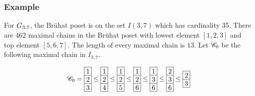 
\subsubsection{Example}

For \(G_{{3},{7}}\), the Br\"{u}hat poset is on the set \(I(3,7)\) which has cardinality 35. There are 462 maximal chains in the Br\"{u}hat poset with lowest element \([1,2,3]\) and top element \([5,6,7]\). The length of every maximal chain is \(13\). Let \(\mathscr{C}_0\) be the following maximal chain in \(I_{3,7}\). 

\[
\SC_0 = 
\begin{array}[c]{*{1}c}\cline{1-1}
\lr{1}\\\cline{1-1}
\lr{2}\\\cline{1-1}
\lr{3}\\\cline{1-1}
\end{array}
\le
\begin{array}[c]{*{1}c}\cline{1-1}
\lr{1}\\\cline{1-1}
\lr{2}\\\cline{1-1}
\lr{4}\\\cline{1-1}
\end{array}
\le
\begin{array}[c]{*{1}c}\cline{1-1}
\lr{1}\\\cline{1-1}
\lr{2}\\\cline{1-1}
\lr{5}\\\cline{1-1}
\end{array}
\le
\begin{array}[c]{*{1}c}\cline{1-1}
\lr{1}\\\cline{1-1}
\lr{2}\\\cline{1-1}
\lr{6}\\\cline{1-1}
\end{array}
\le
\begin{array}[c]{*{1}c}\cline{1-1}
\lr{1}\\\cline{1-1}
\lr{3}\\\cline{1-1}
\lr{6}\\\cline{1-1}
\end{array}
\le
\begin{array}[c]{*{1}c}\cline{1-1}
\lr{2}\\\cline{1-1}
\lr{3}\\\cline{1-1}
\lr{6}\\\cline{1-1}
\end{array}
\le
\begin{array}[c]{*{1}c}\cline{1-1}
\lr{2}\\\cline{1-1}
\lr{3}\\\cline{1-1}

\end{array}\]
